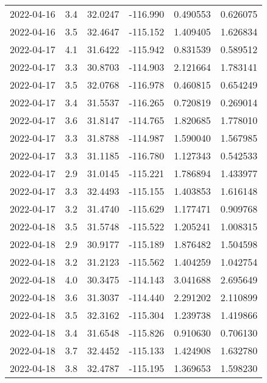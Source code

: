 \begin{tabular}{lrrrrr}
2022-04-16 &       3.4 &  32.0247 &  -116.990 &         0.490553 &         0.626075 \\
2022-04-16 &       3.5 &  32.4647 &  -115.152 &         1.409405 &         1.626834 \\
2022-04-17 &       4.1 &  31.6422 &  -115.942 &         0.831539 &         0.589512 \\
2022-04-17 &       3.3 &  30.8703 &  -114.903 &         2.121664 &         1.783141 \\
2022-04-17 &       3.5 &  32.0768 &  -116.978 &         0.460815 &         0.654249 \\
2022-04-17 &       3.4 &  31.5537 &  -116.265 &         0.720819 &         0.269014 \\
2022-04-17 &       3.6 &  31.8147 &  -114.765 &         1.820685 &         1.778010 \\
2022-04-17 &       3.3 &  31.8788 &  -114.987 &         1.590040 &         1.567985 \\
2022-04-17 &       3.3 &  31.1185 &  -116.780 &         1.127343 &         0.542533 \\
2022-04-17 &       2.9 &  31.0145 &  -115.221 &         1.786894 &         1.433977 \\
2022-04-17 &       3.3 &  32.4493 &  -115.155 &         1.403853 &         1.616148 \\
2022-04-17 &       3.2 &  31.4740 &  -115.629 &         1.177471 &         0.909768 \\
2022-04-18 &       3.5 &  31.5748 &  -115.522 &         1.205241 &         1.008315 \\
2022-04-18 &       2.9 &  30.9177 &  -115.189 &         1.876482 &         1.504598 \\
2022-04-18 &       3.2 &  31.2123 &  -115.562 &         1.404259 &         1.042754 \\
2022-04-18 &       4.0 &  30.3475 &  -114.143 &         3.041688 &         2.695649 \\
2022-04-18 &       3.6 &  31.3037 &  -114.440 &         2.291202 &         2.110899 \\
2022-04-18 &       3.5 &  32.3162 &  -115.304 &         1.239738 &         1.419866 \\
2022-04-18 &       3.4 &  31.6548 &  -115.826 &         0.910630 &         0.706130 \\
2022-04-18 &       3.7 &  32.4452 &  -115.133 &         1.424908 &         1.632780 \\
2022-04-18 &       3.8 &  32.4787 &  -115.195 &         1.369653 &         1.598230 \\

\end{tabular}
